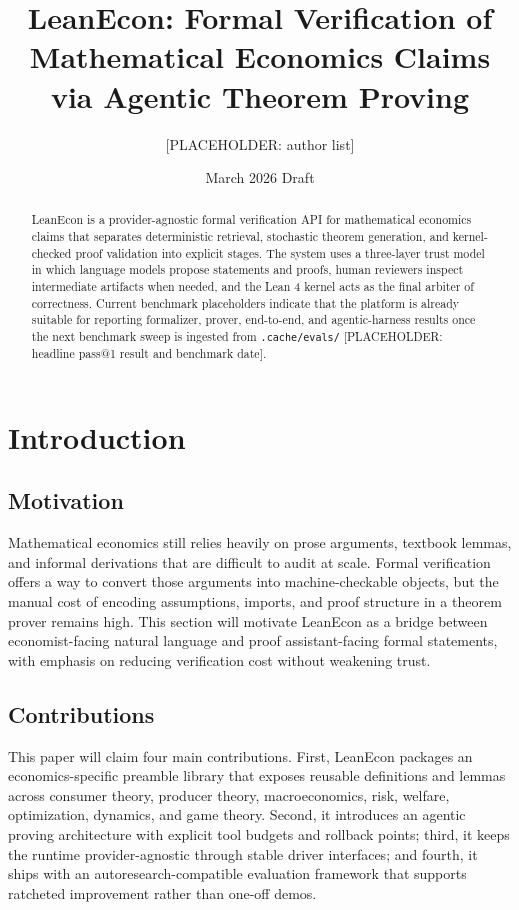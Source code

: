 \documentclass[11pt,letterpaper]{article}
\title{LeanEcon: Formal Verification of Mathematical Economics Claims via Agentic Theorem Proving}
\author{[PLACEHOLDER: author list]}
\date{March 2026 Draft}
\begin{document}
\maketitle

\begin{abstract}
LeanEcon is a provider-agnostic formal verification API for mathematical economics claims that separates deterministic retrieval, stochastic theorem generation, and kernel-checked proof validation into explicit stages. The system uses a three-layer trust model in which language models propose statements and proofs, human reviewers inspect intermediate artifacts when needed, and the Lean 4 kernel acts as the final arbiter of correctness. Current benchmark placeholders indicate that the platform is already suitable for reporting formalizer, prover, end-to-end, and agentic-harness results once the next benchmark sweep is ingested from \texttt{.cache/evals/} [PLACEHOLDER: headline pass@1 result and benchmark date].
\end{abstract}

\section{Introduction}

\subsection{Motivation}

Mathematical economics still relies heavily on prose arguments, textbook lemmas, and informal derivations that are difficult to audit at scale. Formal verification offers a way to convert those arguments into machine-checkable objects, but the manual cost of encoding assumptions, imports, and proof structure in a theorem prover remains high. This section will motivate LeanEcon as a bridge between economist-facing natural language and proof assistant-facing formal statements, with emphasis on reducing verification cost without weakening trust.

\subsection{Contributions}

This paper will claim four main contributions. First, LeanEcon packages an economics-specific preamble library that exposes reusable definitions and lemmas across consumer theory, producer theory, macroeconomics, risk, welfare, optimization, dynamics, and game theory. Second, it introduces an agentic proving architecture with explicit tool budgets and rollback points; third, it keeps the runtime provider-agnostic through stable driver interfaces; and fourth, it ships with an autoresearch-compatible evaluation framework that supports ratcheted improvement rather than one-off demos.
\end{document}

